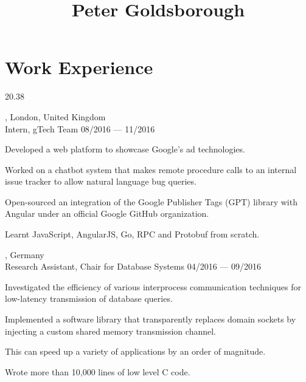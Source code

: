 




\begin{header}
	\title{Peter Goldsborough}
	\separate
	\separate
\end{header}

\section{Work Experience}{2}{0.38}


\vspace{-2mm}
\begin{entry}
	{, London, United Kingdom}
	{\\Intern, gTech Team}
	{08/2016 --- 11/2016}
  \item Developed a web platform to showcase Google’s ad technologies.
  \item Worked on a chatbot system that makes remote procedure calls to an internal issue tracker to allow natural language bug queries.
  \item Open-sourced an integration of the Google Publisher Tags (GPT) library with Angular under an official Google GitHub organization.
  \item Learnt JavaScript, AngularJS, Go, RPC and Protobuf from scratch.
\end{entry}

\begin{entry}
	{, Germany}
	{\\Research Assistant, Chair for Database Systems}
	{04/2016 --- 09/2016}

  \item Investigated the efficiency of various interprocess communication techniques for low-latency transmission of database queries.
  \item Implemented a software library that transparently replaces domain sockets by injecting a custom shared memory transmission channel.
  \item This can speed up a variety of applications by an order of magnitude.
  \item Wrote more than 10,000 lines of low level C code.
\end{entry}

